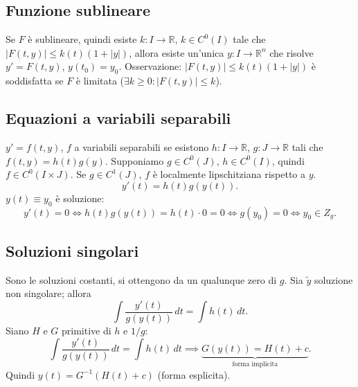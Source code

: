 \documentclass[11pt,a4paper]{article}
\newcommand{\R}{\mathbb R}\newcommand{\N}{\mathbb N}\newcommand{\pagina}[1]{\clearpage}
\begin{document}
\subsection*{Funzione sublineare}
Se $F$ è sublineare, quindi esiste $k:I\to\R$, $k\in C^0(I)$ tale che $|F(t,y)|\le k(t)(1+|y|)$, allora esiste un'unica $y:I\to\R^n$ che risolve $y'=F(t,y)$, $y(t_0)=y_0$.
Osservazione: $|F(t,y)|\le k(t)(1+|y|)$ è soddisfatta se $F$ è limitata ($\exists k\ge0:|F(t,y)|\le k$).
\subsection*{Equazioni a variabili separabili}
$y'=f(t,y)$, $f$ a variabili separabili se esistono $h:I\to\R$, $g:J\to\R$ tali che $f(t,y)=h(t)g(y)$. Supponiamo $g\in C^0(J)$, $h\in C^0(I)$, quindi $f\in C^0(I\times J)$. Se $g\in C^1(J)$, $f$ è localmente lipschitziana rispetto a $y$.
\[y'(t)=h(t)g(y(t)).\]
$y(t)\equiv y_0$ è soluzione:
\[y'(t)=0\iff h(t)g(y(t))=h(t)\cdot0=0\iff g(y_0)=0\iff y_0\in Z_g.\]
\pagina{48}
\subsection*{Soluzioni singolari}
Sono le soluzioni costanti, si ottengono da un qualunque zero di $g$. Sia $\widetilde y$ soluzione non singolare; allora
\[\int\frac{y'(t)}{g(y(t))}\,dt=\int h(t)\,dt.\]
Siano $H$ e $G$ primitive di $h$ e $1/g$:
\[\int\frac{y'(t)}{g(y(t))}\,dt=\int h(t)\,dt\implies\underbrace{G(y(t))=H(t)+c}_{\text{forma implicita}}.\]
Quindi $y(t)=G^{-1}(H(t)+c)$ (forma esplicita).
\end{document}
